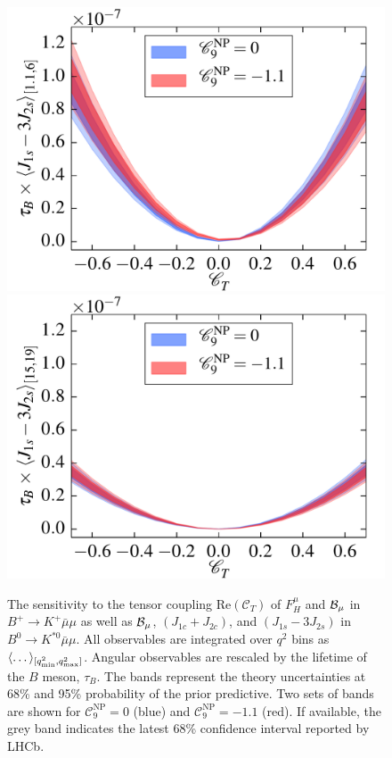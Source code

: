 \documentclass[twocolumn,epjc3]{svjour3}
\numberwithin{equation}{section}
\newcommand{\wilson}[2][{}]{\mathcal{C}_{#2}^{\mathrm{#1}}}
\renewcommand{\[}{\big[}
\renewcommand{\]}{\big]}
\renewcommand{\(}{\big(}
\renewcommand{\)}{\big)}
\newlength{\relwidth}
\begin{document}
\begin{figure}
\begin{center}
    \\
    \includegraphics[width=\relwidth]{plots/pdf/ct_Kstar_J_1s_minus_3J_2s1to6}
    \includegraphics[width=\relwidth]{plots/pdf/ct_Kstar_J_1s_minus_3J_2s15to19}
  \end{center}
  \caption{ The sensitivity to the tensor coupling
    $\mbox{Re}(\wilson{T})$ of $F_H^\mu$ and {${\cal B}_\mu$} in $B^+
    \to K^+ \bar\mu\mu$ {as well as} {${\cal B}_\mu$},
    $(J_{1c} + J_{2c})$, and $(J_{1s}-3 J_{2s})$ in $B^0 \to K^{*0}
    \bar\mu\mu$. All observables are integrated over $q^2$ bins as
    $\langle \dots \rangle_{[q^2_{\rm min}, q^2_{\rm max}]}$. Angular
    observables are rescaled by the lifetime of the $B$ meson,
    $\tau_B$. The bands represent the theory uncertainties at 68\% and
    95\% probability of the prior predictive.  Two sets of bands are
    shown for $\wilson[NP]{9} = 0$ (blue) and $\wilson[NP]{9} = -1.1$
    (red). If available, the grey band indicates the latest 68\%
    confidence interval reported by LHCb.}
  \label{fig:FHvsCT}
\end{figure}
\end{document}
